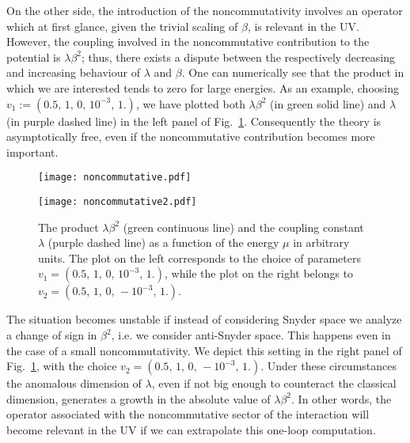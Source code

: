 \documentclass[a4paper,10pt]{amsart}
\begin{document}
 On the other side, the introduction of the noncommutativity involves an operator which at first glance,
 given the trivial scaling of $\beta$,
 is relevant in the UV.
 However, the coupling involved in the noncommutative contribution to the potential is $\lambda\beta^2$;
 thus, there exists a dispute between the respectively decreasing and increasing behaviour of $\lambda$ and $\beta$.
 One can numerically see that the product in which we are interested tends to zero for large energies.
 As an example, choosing $v_1:=(0.5,\,1,\,0,\,10^{-3},\,1.)$, we have plotted both $\lambda\beta^2$ (in green solid line) and $\lambda$ (in purple dashed line)
 in the left panel of Fig.~\ref{fig:running_noncommutative}.
 Consequently the theory is asymptotically free, even if the noncommutative contribution becomes more important.


 \begin{figure}[h!]
 \begin{minipage}{0.48\textwidth}

 \begin{center}
 \texttt{[image: noncommutative.pdf]}
 \end{center}
\end{minipage}
 \begin{minipage}{0.48\textwidth}

 \begin{center}
 \texttt{[image: noncommutative2.pdf]}
 \end{center}
\end{minipage}

 \caption{The product $\lambda\beta^2$ (green continuous line) and the coupling constant $\lambda$ (purple dashed line) as a function of the energy $\mu$ in arbitrary units.
 The plot on the left corresponds to the choice of parameters $v_1=(0.5,\,1,\,0,\,10^{-3},\,1.)$, while the plot on the right belongs to $v_2=(0.5,\,1,\,0,\,-10^{-3},\,1.)$.
 }
 \label{fig:running_noncommutative}
\end{figure}

 The situation becomes unstable if instead of considering Snyder space we analyze a change of sign in $\beta^2$,
 i.e. we  consider anti-Snyder space. This happens  even in the case of a small noncommutativity.
 We depict this setting in the right panel of Fig.~\ref{fig:running_noncommutative}, with the choice $v_2=(0.5,\,1,\,0,\,-10^{-3},\,1.)$.
 Under these circumstances the anomalous dimension of $\lambda$, even if  not big enough to
 counteract the classical dimension, generates a growth in the absolute value of $\lambda\beta^2$.
 In other words, the operator associated with the noncommutative sector of the interaction will become relevant in the UV
 if we can extrapolate this one-loop computation.
\end{document}
